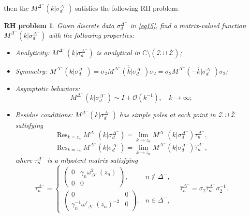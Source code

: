 \documentclass[11pt]{article}
\numberwithin{equation}{section}
\newtheorem{RHP}{RH problem}
\DeclareMathOperator*{\res}{Res}
\begin{document}
then the $M^{\Delta^-}(k|\sigma_d^{\Delta^-})$ satisfies the following RH problem:
\begin{RHP}\label{rhp8}
    Given discrete data $\sigma_d^{\Delta^-}$ in \eqref{eq15}, find a matrix-valued function $M^{\Delta^-}(k|\sigma_d^{\Delta^-})$ with the following properties:

\begin{itemize}
    \item Analyticity: $M^{\Delta^-}(k|\sigma_d^{\Delta^-})$ is analytical in $\mathbb{C} \setminus (\mathcal{Z} \cup \overline{\mathcal{Z}})$;
    \item Symmetry: $M^{\Delta^-}(k|\sigma_d^{\Delta^-}) = \sigma_2\overline{M^{\Delta^-}(\overline{k}|\sigma_d^{\Delta^-})}  \sigma_2 =  \sigma_2M^{\Delta^-}(-\overline{k}|\sigma_d^{\Delta^-}) \sigma_2$;
    \item Asymptotic behaviors:
    \begin{equation*}
         M^{\Delta^-}(k|\sigma_d^{\Delta^-}) \sim I + \mathcal{O}(k^{-1}), \quad k \to \infty;
    \end{equation*}
    \item Residue conditions: $M^{\Delta^-}(k|\sigma_d^{\Delta^-})$ has simple poles at each point in $\mathcal{Z} \cup \overline{\mathcal{Z}}$ satisfying
    \begin{equation*}
          \res_{k = z_n} M^{\Delta^-}(k|\sigma_d^{\Delta^-}) = \lim_{k \to z_n} M^{\Delta^-}(k|\sigma_d^{\Delta^-}) \tau_n^{\Delta^-},
    \end{equation*}
    \begin{equation*}
        \res_{k = \overline{z}_n} M^{\Delta^-}(k|\sigma_d^{\Delta^-}) = \lim_{k \to \overline{z}_n} M^{\Delta^-}(k|\sigma_d^{\Delta^-}) \widehat{\tau}_n^{\Delta^-},
    \end{equation*}
    where $\tau_n^{\Delta^-}$ is a nilpotent matrix satisfying
    \begin{equation}\label{eq34}
    \tau_n^{\Delta^-} =
    \begin{cases}
        \begin{pmatrix}
            0 & \gamma_n \omega_{\Delta^-}^2(z_n) \\
            0 & 0
        \end{pmatrix}, & n \notin \Delta^-, \\
        \begin{pmatrix}
            0 & 0 \\
            \gamma_n^{-1} \omega'_{\Delta^-}(z_n)^{-2} & 0
        \end{pmatrix}, & n \in \Delta^-,
    \end{cases}
    \quad \widehat{\tau}_n^{\Delta^-} = \sigma_2 \overline{\tau}_n^{\Delta^-} \sigma_2^{-1}.
    \end{equation}
\end{itemize}

\end{RHP}
\end{document}
